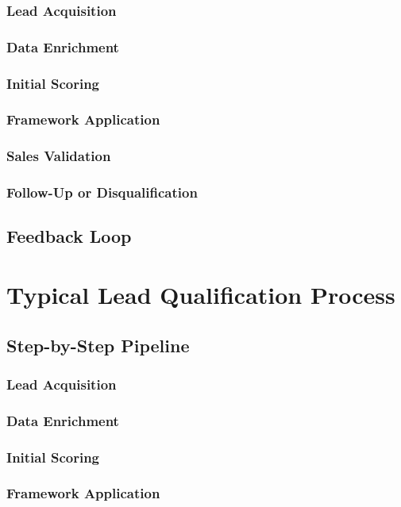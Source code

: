         \subsubsection{Lead Acquisition}\mbox{}
        \subsubsection{Data Enrichment}\mbox{}
        \subsubsection{Initial Scoring}\mbox{}
        \subsubsection{Framework Application}\mbox{}
        \subsubsection{Sales Validation}\mbox{}
        \subsubsection{Follow-Up or Disqualification}\mbox{}
    \subsection{Feedback Loop}\mbox{}

\section{Typical Lead Qualification Process}\mbox{}
    \subsection{Step-by-Step Pipeline}\mbox{}
        \subsubsection{Lead Acquisition}\mbox{}
        \subsubsection{Data Enrichment}\mbox{}
        \subsubsection{Initial Scoring}\mbox{}
        \subsubsection{Framework Application}\mbox{}
